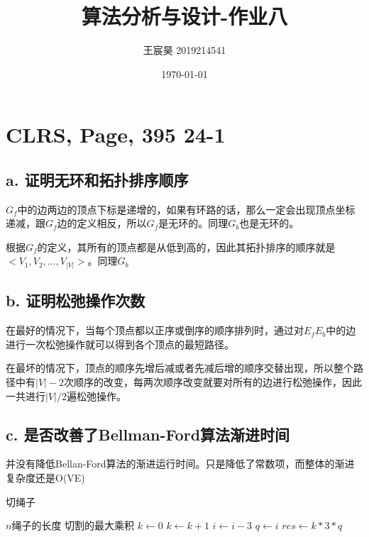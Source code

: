 \documentclass[UTF8]{ctexart}
\title{算法分析与设计-作业八}
\author{王宸昊 2019214541}
\date{\today}
\begin{document}
\maketitle


\section{CLRS, Page, 395 24-1}

\subsection{a. 证明无环和拓扑排序顺序}

$G_f$中的边两边的顶点下标是递增的，如果有环路的话，那么一定会出现顶点坐标递减，跟$G_f$边的定义相反，所以$G_f$是无环的。同理$G_b$也是无环的。

根据$G_f$的定义，其所有的顶点都是从低到高的，因此其拓扑排序的顺序就是$<V_1, V_2, \dots, V_{|V|}>$。同理$G_b$

\subsection{b. 证明松弛操作次数}

在最好的情况下，当每个顶点都以正序或倒序的顺序排列时，通过对$E_f$$E_b$中的边进行一次松弛操作就可以得到各个顶点的最短路径。

在最坏的情况下，顶点的顺序先增后减或者先减后增的顺序交替出现，所以整个路径中有$|V|-2$次顺序的改变，每两次顺序改变就要对所有的边进行松弛操作，因此一共进行$|V|/2$遍松弛操作。

\subsection{c. 是否改善了Bellman-Ford算法渐进时间}

并没有降低Bellan-Ford算法的渐进运行时间。只是降低了常数项，而整体的渐进复杂度还是O(VE)


\begin{algorithm}
    \caption{切绳子}
    \begin{algorithmic}[1] %
        \Require $n$绳子的长度
        \Ensure 切割的最大乘积
            \EndIf
            \EndIf
            \EndIf
            \State $k \gets 0$
                \State $k \gets k + 1$
                \State $i \gets i - 3$
            \EndFor
            \State $q \gets i$
            \State $res \gets k * 3 * q$
            \State {}
        \EndFunction
    \end{algorithmic}
\end{algorithm}
\end{document}
